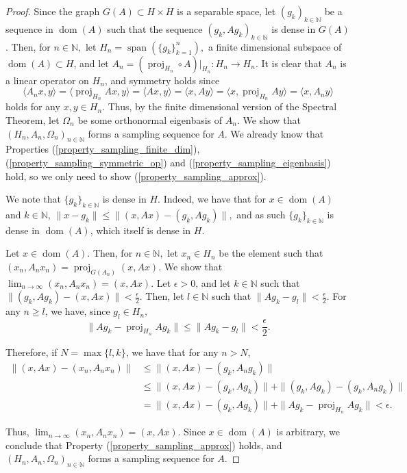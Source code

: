 \documentclass{amsart}
\theoremstyle{definition}
\theoremstyle{remark}
\def \Proj{\operatorname{proj}}
\def \Span{\operatorname{span}}
\def \Dom{\operatorname{dom}}
\def \LL{\langle}
\def \RR{\rangle}
\begin{document}
\begin{proof}
	Since the graph $G(A)\subset H\times H$ is a separable space, let $(g_k)_{k\in\mathbb{N}}$ be a sequence in $\Dom(A)$ such that the sequence $(g_k, Ag_k)_{k\in\mathbb{N}}$ is dense in $G(A)$. Then, for $n\in\mathbb{N},$ let $H_n=\Span(\{g_k\}_{k=1}^n),$ a finite dimensional subspace of $\Dom(A)\subset H$, and let $A_n=(\Proj_{H_n}\circ A)|_{H_n}:H_n\rightarrow H_n.$ It is clear that $A_n$ is a linear operator on $H_n$, and symmetry holds since $$\LL A_nx, y \RR=\LL \Proj_{H_n}Ax,y\RR =\LL Ax,y\RR=\LL x, Ay\RR=\LL x, \Proj_{H_n} Ay\RR=\LL x, A_ny\RR$$ holds for any $x,y\in H_n.$ Thus, by the finite dimensional version of the Spectral Theorem, let $\Omega_n$ be some orthonormal eigenbasis of $A_n$. We show that $(H_n,A_n,\Omega_n)_{n\in\mathbb{N}}$ forms a sampling sequence for $A$. We already know that Properties (\ref{property_sampling_finite_dim}), (\ref{property_sampling_symmetric_op}) and (\ref{property_sampling_eigenbasis}) hold, so we only need to show (\ref{property_sampling_approx}).
	
	We note that $\{g_k\}_{k\in\mathbb{N}}$ is dense in $H$. Indeed, we have that for $x\in\Dom(A)$ and $k\in\mathbb{N}$, $\|x-g_k\|\leq\|(x,Ax)-(g_k,Ag_k)\|,$ and as such $\{g_k\}_{k\in\mathbb{N}}$ is dense in $\Dom(A)$, which itself is dense in $H$.
	
	  Let $x\in\Dom(A).$ Then, for $n\in\mathbb{N},$ let $x_n\in H_n$ be the element such that $(x_n, A_n x_n)=\Proj_{G(A_n)}(x,Ax).$ We show that $\lim_{n\rightarrow\infty} (x_n, A_nx_n)=(x,Ax).$ Let $\epsilon>0$, and let $k\in\mathbb{N}$ such that $\|(g_k,A g_k)-(x,Ax)\|<\frac{\epsilon}{2}.$ Then, let $l\in\mathbb{N}$ such that $\|A g_k-g_l\|<\frac{\epsilon}{2}.$ For any $n\geq l$, we have, since $g_l\in H_n,$  $$\|Ag_k-\Proj_{H_n}Ag_k\|\leq\|Ag_k-g_l\|<\frac{\epsilon}{2}.$$ 
	  
	  Therefore, if $N=\max\{l,k\}$, we have that for any $n>N$, 
	  \begin{align*}
	  	\|(x,Ax)-(x_n,A_nx_n)\|&\leq \|(x,Ax)-(g_k,A_ng_k)\|\\
	  	&\leq \|(x,Ax)-(g_k,Ag_k)\|+\|(g_k,Ag_k)-(g_k,A_ng_k)\|\\
	  	&=\|(x,Ax)-(g_k,Ag_k)\|+\|Ag_k-\Proj_{H_n}Ag_k\|<\epsilon.
	  \end{align*} 
	  
	  Thus, $\lim_{n\rightarrow\infty}(x_n,A_nx_n)=(x,Ax).$ Since $x\in\Dom(A)$ is arbitrary, we conclude that Property (\ref{property_sampling_approx}) holds, and $(H_n, A_n,\Omega_n)_{n\in\mathbb{N}}$ forms a sampling sequence for $A$.
\end{proof}
\end{document}
